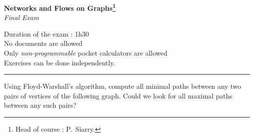 \documentclass[12pt,a4paper]{article}
\begin{document}
\begin{center}

  {\Large \textbf{Networks and Flows on Graphs\footnote{Head of course : P.~Siarry.}}}\\

  \vspace{10pt}
  {\Large \textit{Final Exam}}

  \vspace{2\baselineskip}
\end{center}
\begin{center}
\begin{minipage}{\textwidth}
  Duration of the exam : 1h30\\
  No documents are allowed\\
  Only \emph{non-programmable} pocket calculators are allowed\\
  Exercises can be done independently.
\end{minipage}
\end{center}
\rule{\textwidth}{2pt}

\vspace{\baselineskip}

\begin{question}
  Using Floyd-Warshall's algorithm, compute all minimal paths between
  any two pairs of vertices of the following graph. Could we look for
  all maximal paths between any such pairs?  \vspace{2\baselineskip}
  \begin{center}
  \end{center}
  \vspace{2\baselineskip}
\end{question}
\end{document}
